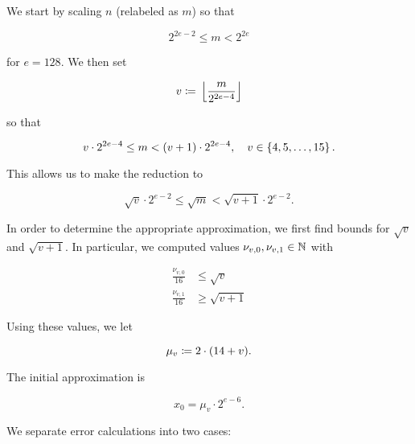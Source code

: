 We start by scaling $n$ (relabeled as $m$) so that

\begin{equation}
    2^{2e-2} \le m < 2^{2e}
\end{equation}

\noindent
for $e = 128$.
We then set

\begin{equation}
    v \coloneqq{} \left\lfloor \frac{m}{2^{2e-4}} \right\rfloor
\end{equation}

\noindent
so that

\begin{equation}
    v\cdot2^{2e-4} \le m < \left( v+1 \right)\cdot2^{2e-4},
    \quad v\in\left\{ 4, 5, \dots, 15 \right\}.
\end{equation}

\noindent
This allows us to make the reduction to

\begin{equation}
    \sqrt{v}\cdot2^{e-2} \le \sqrt{m} < \sqrt{v+1}\cdot2^{e-2}.
    \label{eq:app_linear_m_bound}
\end{equation}

In order to determine the appropriate approximation,
we first find bounds for $\sqrt{v}$ and $\sqrt{v+1}$.
In particular, we computed values $\nu_{v,0}, \nu_{v,1}\in\mathbb{N}$ with

\begin{align}
    \frac{\nu_{v,0}}{16} &\le \sqrt{v} \nonumber\\
    \frac{\nu_{v,1}}{16} &\ge \sqrt{v+1}
    \label{eq:app_linear_v_bound}
\end{align}

\noindent
Using these values,
we let

\begin{equation}
    \mu_{v} \coloneqq{} 2\cdot(14 + v).
\end{equation}

The initial approximation is

\begin{equation}
    x_{0} = \mu_{v}\cdot2^{e-6}.
\end{equation}

\noindent
We separate error calculations into two cases:

